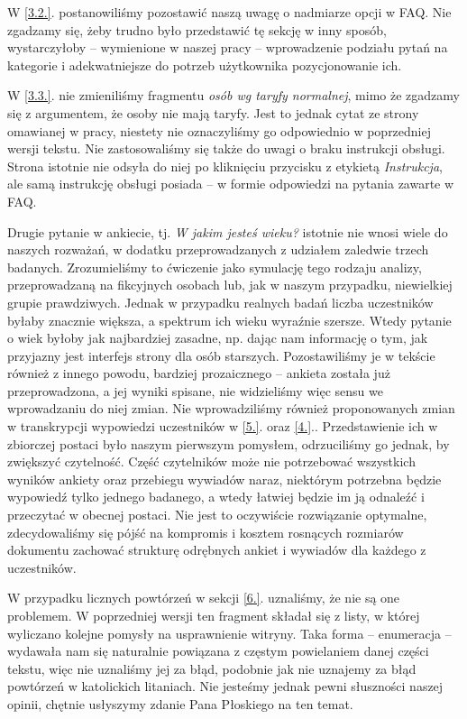 \documentclass{article}
\begin{document}
W \ref{3.2.}. postanowiliśmy pozostawić naszą uwagę o nadmiarze opcji w FAQ. Nie zgadzamy się, żeby trudno było przedstawić tę sekcję w inny sposób, wystarczyłoby -- wymienione w naszej pracy -- wprowadzenie podziału pytań na kategorie i adekwatniejsze do potrzeb użytkownika pozycjonowanie ich.

W \ref{3.3.}. nie zmieniliśmy fragmentu \emph{osób wg taryfy normalnej}, mimo że zgadzamy się z argumentem, że osoby nie mają taryfy. Jest to jednak cytat ze strony omawianej w pracy, niestety nie oznaczyliśmy go odpowiednio w poprzedniej wersji tekstu. Nie zastosowaliśmy się także do uwagi o braku instrukcji obsługi. Strona istotnie nie odsyła do niej po kliknięciu przycisku z etykietą \emph{Instrukcja}, ale samą instrukcję obsługi posiada -- w formie odpowiedzi na pytania zawarte w FAQ.

Drugie pytanie w ankiecie, tj. \emph{W jakim jesteś wieku?} istotnie nie wnosi wiele do naszych rozważań, w dodatku przeprowadzanych z udziałem zaledwie trzech badanych. Zrozumieliśmy to ćwiczenie jako symulację tego rodzaju analizy, przeprowadzaną na fikcyjnych osobach lub, jak w naszym przypadku, niewielkiej grupie prawdziwych. Jednak w przypadku realnych badań liczba uczestników byłaby znacznie większa, a spektrum ich wieku wyraźnie szersze. Wtedy pytanie o wiek byłoby jak najbardziej zasadne, np. dając nam informację o tym, jak przyjazny jest interfejs strony dla osób starszych. Pozostawiliśmy je w tekście również z innego powodu, bardziej prozaicznego -- ankieta została już przeprowadzona, a jej wyniki spisane, nie widzieliśmy więc sensu we wprowadzaniu do niej zmian. Nie wprowadziliśmy również proponowanych zmian w transkrypcji wypowiedzi uczestników w  \ref{5.}. oraz \ref{4.}.. Przedstawienie ich w zbiorczej postaci było naszym pierwszym pomysłem, odrzuciliśmy go jednak, by zwiększyć czytelność. Część czytelników może nie potrzebować wszystkich wyników ankiety oraz przebiegu wywiadów naraz, niektórym potrzebna będzie wypowiedź tylko jednego badanego, a wtedy łatwiej będzie im ją odnaleźć i przeczytać w obecnej postaci. Nie jest to oczywiście rozwiązanie optymalne, zdecydowaliśmy się pójść na kompromis i kosztem rosnących rozmiarów dokumentu zachować strukturę odrębnych ankiet i wywiadów dla każdego z uczestników.

W przypadku licznych powtórzeń w sekcji \ref{6.}. uznaliśmy, że nie są one problemem. W poprzedniej wersji ten fragment składał się z listy, w której wyliczano kolejne pomysły na usprawnienie witryny. Taka forma -- enumeracja -- wydawała nam się naturalnie powiązana z częstym powielaniem danej części tekstu, więc nie uznaliśmy jej za błąd, podobnie jak nie uznajemy za błąd powtórzeń w katolickich litaniach. Nie jesteśmy jednak pewni słuszności naszej opinii, chętnie usłyszymy zdanie Pana Płoskiego na ten temat.
    
\end{document}
